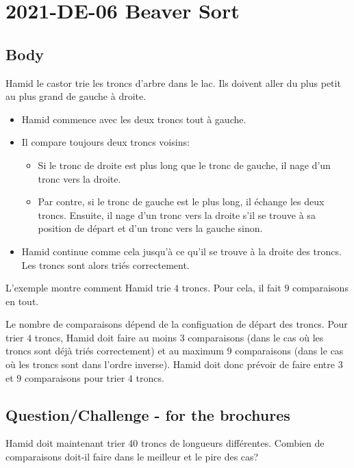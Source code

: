 \documentclass[a4paper,11pt]{report}
\newcommand{\taskGraphicsFolder}{..}
\begin{document}
\section*{\centering{} 2021-DE-06 Beaver Sort}


\subsection*{Body}

Hamid le castor trie les troncs d’arbre dans le lac. Ils doivent aller du plus petit au plus grand de gauche à droite.

\begin{itemize}
  \item Hamid commence avec les deux troncs tout à gauche.
  \item Il compare toujours deux troncs voisins:

\begin{itemize}
  \item Si le tronc de droite est plus long que le tronc de gauche, il nage d’un tronc vers la droite.
  \item Par contre, si le tronc de gauche est le plus long, il échange les deux troncs. Ensuite, il nage d’un tronc vers la droite s’il se trouve à sa position de départ et d’un tronc vers la gauche sinon.
\end{itemize}


  \item Hamid continue comme cela jusqu’à ce qu’il se trouve à la droite des troncs. Les troncs sont alors triés correctement.
\end{itemize}

L’exemple montre comment Hamid trie $4$ troncs. Pour cela, il fait $9$ comparaisons en tout.

{\centering%
\par}

Le nombre de comparaisons dépend de la configuation de départ des troncs. Pour trier $4$ troncs, Hamid doit faire au moins $3$ comparaisons (dans le cas où les troncs sont déjà triés correctement) et au maximum $9$ comparaisons (dans le cas où les troncs sont dans l’ordre inverse). Hamid doit donc prévoir de faire entre $3$ et $9$ comparaisons pour trier $4$ troncs.

{\em


\subsection*{Question/Challenge - for the brochures}

Hamid doit maintenant trier 40 troncs de longueurs différentes. Combien de comparaisons doit-il faire dans le meilleur et le pire des cas?

}
\end{document}
